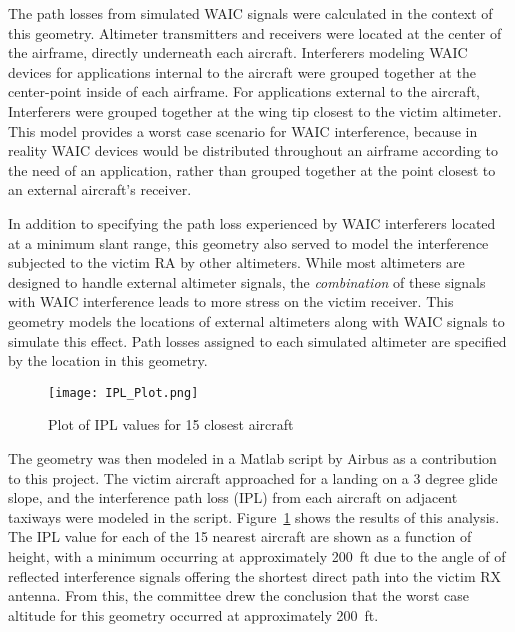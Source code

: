 The path losses from simulated WAIC signals were calculated in the context of this geometry. Altimeter transmitters and receivers were located at the center of the airframe, directly underneath each aircraft. Interferers modeling WAIC devices for applications internal to the aircraft were grouped together at the center-point inside of each airframe. For applications external to the aircraft, Interferers were grouped together at the wing tip closest to the victim altimeter. This model provides a worst case scenario for WAIC interference, because in reality WAIC devices would be distributed throughout an airframe according to the need of an application, rather than grouped together at the point closest to an external aircraft's receiver. 
%	

In addition to specifying the path loss experienced by WAIC interferers located at a minimum slant range, this geometry also served to model the interference subjected to the victim RA by other altimeters. While most altimeters are designed to handle external altimeter signals, the \textit{combination} of these signals with WAIC interference leads to more stress on the victim receiver. This geometry models the locations of external altimeters along with WAIC signals to simulate this effect. Path losses assigned to each simulated altimeter are specified by the location in this geometry. 

\begin{figure}[ht]
\centering
\texttt{[image: IPL\_Plot.png]}
\caption{Plot of IPL values for 15 closest aircraft}

\label{fig:IPL}

\end{figure}

The geometry was then modeled in a Matlab script by Airbus as a contribution to this project. The victim aircraft approached for  a landing on a 3 degree glide slope, and the interference path loss (IPL) from each aircraft on adjacent taxiways were modeled  in the script. Figure~\ref{fig:IPL} shows the results of this analysis. The IPL value for each of the 15 nearest aircraft are shown as a function of height, with a minimum occurring at approximately 200~ft due to the angle of of reflected interference signals offering the shortest direct path into the victim RX antenna. From this, the committee drew the conclusion that the worst case altitude for this geometry occurred at approximately 200~ft. 

